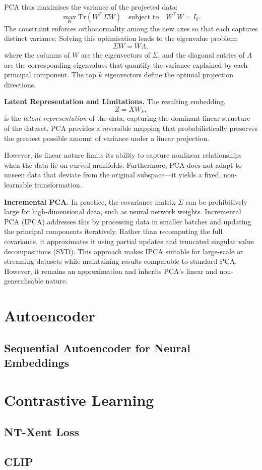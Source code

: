 PCA thus maximises the variance of the projected data:
\[
\max_{W} \text{Tr}(W^\top \Sigma W)
\quad \text{subject to} \quad W^\top W = I_k.
\]
The constraint enforces orthonormality among the new axes so that each captures distinct variance. Solving this optimisation leads to the eigenvalue problem:
\[
\Sigma W = W \Lambda,
\]
where the columns of \( W \) are the eigenvectors of \( \Sigma \), and the diagonal entries of \( \Lambda \) are the corresponding eigenvalues that quantify the variance explained by each principal component. The top \( k \) eigenvectors define the optimal projection directions.

\vspace{0.5em}
\noindent
\textbf{Latent Representation and Limitations.}
The resulting embedding,
\[
Z = X W_k,
\]
is the \textit{latent representation} of the data, capturing the dominant linear structure of the dataset.  
PCA provides a reversible mapping that probabilistically preserves the greatest possible amount of variance under a linear projection. 

However, its linear nature limits its ability to capture nonlinear relationships when the data lie on curved manifolds. Furthermore, PCA does not adapt to unseen data that deviate from the original subspace—it yields a fixed, non-learnable transformation.

\vspace{0.5em}
\noindent
\textbf{Incremental PCA.}
In practice, the covariance matrix \( \Sigma \) can be prohibitively large for high-dimensional data, such as neural network weights. Incremental PCA (IPCA) addresses this by processing data in smaller batches and updating the principal components iteratively. Rather than recomputing the full covariance, it approximates it using partial updates and truncated singular value decompositions (SVD).  
This approach makes IPCA suitable for large-scale or streaming datasets while maintaining results comparable to standard PCA. However, it remains an approximation and inherits PCA’s linear and non-generalisable nature.


\section{Autoencoder}
\label{sec:autoencoders}

\subsection{Sequential Autoencoder for Neural Embeddings}

\section{Contrastive Learning}
\label{sec:contrastive}

\subsection{NT-Xent Loss}

\subsection{CLIP}
